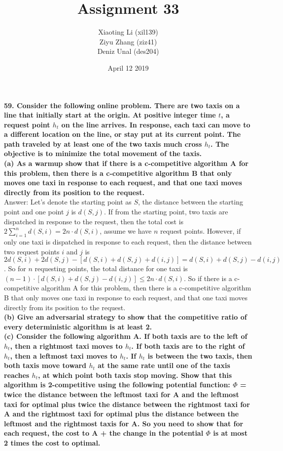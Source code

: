 \documentclass{article}
\title{Assignment 33}
\author{Xiaoting Li (xil139) \\
Ziyu Zhang (ziz41) \\
Deniz Unal (des204)}
\date{April 12 2019}
\begin{document}
\maketitle

\noindent
\textbf{59. Consider the following online problem. There are two taxis on a line that initially start at the origin. At positive integer time $t$, a request point $h_t$ on the line arrives. In response, each taxi can move to a different location on the line, or stay put at its current point. The path traveled by at least one of the two taxis much cross $h_t$. The objective is to minimize the total movement of the taxis.} \\ \newline
\textbf{(a) As a warmup show that if there is a c-competitive algorithm A for this problem, then there is a c-competitive algorithm B that only moves one taxi in response to each request, and that one taxi moves directly from its position to the request.}\\ \newline
Answer: Let's denote the starting point as $S$, the distance between the starting point and one point $j$ is $d(S, j)$. If from the starting point, two taxis are dispatched in response to the request, then the total cost is $2\sum_{i=1}^n d(S, i) = 2n\cdot d(S, i)$, assume we have $n$ request points. However, if only one taxi is dispatched in response to each request, then the distance between two request points $i$ and $j$ is $2d(S, i) + 2d(S, j) - [d(S, i) + d(S, j) + d(i, j)] = d(S, i) + d(S, j) - d(i, j)$. So for $n$ requesting points, the total distance for one taxi is $(n-1)\cdot [d(S, i) + d(S, j) - d(i, j)] \leq 2n\cdot d(S, i)$. So if there is a c-competitive algorithm A for this problem, then there is a c-competitive algorithm B that only moves one taxi in response to each request, and that one taxi moves directly from its position to the request.\\ \newline
\textbf{(b) Give an adversarial strategy to show that the competitive ratio of every deterministic algorithm is at least 2.} \\ \newline
\textbf{(c) Consider the following algorithm A. If both taxis are to the left of $h_t$, then a rightmost taxi moves to $h_t$. If both taxis are to the right of $h_t$, then a leftmost taxi moves to $h_t$. If $h_t$ is between the two taxis, then both taxis move toward $h_t$ at the same rate until one of the taxis reaches $h_t$, at which point both taxis stop moving. Show that this algorithm is 2-competitive using the following potential function: $\Phi$ = twice the distance between the leftmost taxi for A and the leftmost taxi for optimal plus twice the distance between the rightmost taxi for A and the rightmost taxi for optimal plus the distance between the leftmost and the rightmost taxis for A. So you need to show that for each request, the cost to A + the change in the potential $\Phi$ is at most 2 times the cost to optimal.
}
\end{document}
